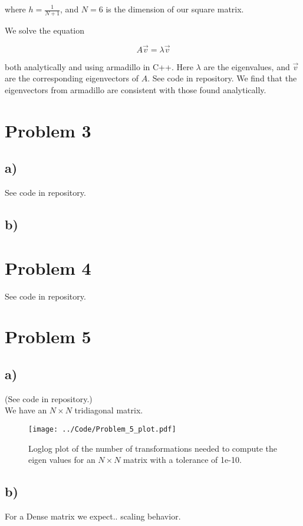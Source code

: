 \documentclass[english,notitlepage]{article}  %
\begin{document}
where $h = \frac{1}{N+1}$, and $N = 6$ is the dimension of our square matrix.

We solve the equation

\begin{equation*}
    A \vec{v} = \lambda \vec{v}
\end{equation*}

both analytically and using armadillo in C++. Here $\lambda$ are the
eigenvalues, and $\vec{v}$ are the corresponding eigenvectors of $A$. See code
in repository. We find that the eigenvectors from armadillo are consistent with
those found analytically.


\section*{Problem 3}
\subsection*{a)}
See code in repository.

\subsection*{b)}


\section*{Problem 4}

See code in repository.


\section*{Problem 5}
\subsection*{a)}
(See code in repository.)\\
We have an $N \times N$ tridiagonal matrix. 

\begin{figure}[H]
    \centering
    \texttt{[image: ../Code/Problem\_5\_plot.pdf]}
    \caption{Loglog plot of the number of transformations needed to compute the eigen values for an $N \times N$ matrix with a tolerance of 1e-10.}
    \label{fig:5plot}
\end{figure}

\subsection*{b)}
For a Dense matrix we expect.. scaling behavior.
\end{document}
